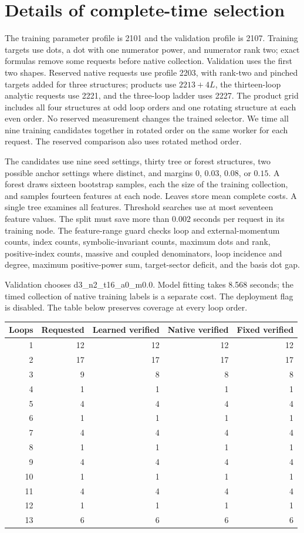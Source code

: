 \section{Details of complete-time selection}
\label{app:refined-time-details}
The training parameter profile is 2101 and the validation profile is 2107. Training targets use dots, a dot with one numerator power, and numerator rank two; exact formulas remove some requests before native collection. Validation uses the first two shapes. Reserved native requests use profile 2203, with rank-two and pinched targets added for three structures; products use $2213+4L$, the thirteen-loop analytic requests use 2221, and the three-loop ladder uses 2227. The product grid includes all four structures at odd loop orders and one rotating structure at each even order. No reserved measurement changes the trained selector. We time all nine training candidates together in rotated order on the same worker for each request. The reserved comparison also uses rotated method order.

The candidates use nine seed settings, thirty tree or forest structures, two possible anchor settings where distinct, and margins $0$, $0.03$, $0.08$, or $0.15$. A forest draws sixteen bootstrap samples, each the size of the training collection, and samples fourteen features at each node. Leaves store mean complete costs. A single tree examines all features. Threshold searches use at most seventeen feature values. The split must save more than $0.002$ seconds per request in its training node. The feature-range guard checks loop and external-momentum counts, index counts, symbolic-invariant counts, maximum dots and rank, positive-index counts, massive and coupled denominators, loop incidence and degree, maximum positive-power sum, target-sector deficit, and the basis dot gap.

Validation chooses d3\_n2\_t16\_a0\_m0.0. Model fitting takes 8.568 seconds; the timed collection of native training labels is a separate cost. The deployment flag is disabled. The table below preserves coverage at every loop order.
\begin{center}\small
\begin{tabular}{@{}rrrrr@{}}\toprule
Loops & Requested & Learned verified & Native verified & Fixed verified\\\midrule
1 & 12 & 12 & 12 & 12\\
2 & 17 & 17 & 17 & 17\\
3 & 9 & 8 & 8 & 8\\
4 & 1 & 1 & 1 & 1\\
5 & 4 & 4 & 4 & 4\\
6 & 1 & 1 & 1 & 1\\
7 & 4 & 4 & 4 & 4\\
8 & 1 & 1 & 1 & 1\\
9 & 4 & 4 & 4 & 4\\
10 & 1 & 1 & 1 & 1\\
11 & 4 & 4 & 4 & 4\\
12 & 1 & 1 & 1 & 1\\
13 & 6 & 6 & 6 & 6\\
\bottomrule\end{tabular}\end{center}
